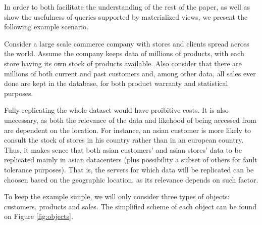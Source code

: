 \documentclass{vldb}
\begin{document}

In order to both facilitate the understanding of the rest of the paper, as well as show the usefulness of queries supported by materialized views, we present the following example scenario.

Consider a large scale commerce company with stores and clients spread across the world.
Assume the company keeps data of millions of products, with each store having its own stock of products available.
Also consider that there are millions of both current and past customers and, among other data, all sales ever done are kept in the database, for both product warranty and statistical purposes.

Fully replicating the whole dataset would have proibitive costs.
It is also unecessary, as both the relevance of the data and likehood of being accessed from are dependent on the location.
For instance, an asian customer is more likely to consult the stock of stores in his country rather than in an european country.
Thus, it makes sence that both asian customers' and asian stores' data to be replicated mainly in asian datacenters (plus possibility a subset of others for fault tolerance purposes).
That is, the servers for which data will be replicated can be choosen based on the geographic location, as its relevance depends on such factor.

To keep the example simple, we will only consider three types of objects: customers, products and sales.
The simplified scheme of each object can be found on Figure \ref{fig:objects}.
\end{document}
